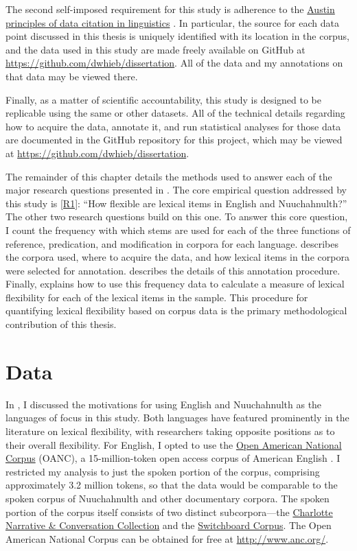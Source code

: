The second self-imposed requirement for this study is adherence to the \href{https://site.uit.no/linguisticsdatacitation/}{Austin principles of data citation in linguistics} \parencite{BerezKroekeretal2018}. In particular, the source for each data point discussed in this thesis is uniquely identified with its location in the corpus, and the data used in this study are made freely available on GitHub at \url{https://github.com/dwhieb/dissertation}. All of the data and my annotations on that data may be viewed there.

Finally, as a matter of scientific accountability, this study is designed to be replicable using the same or other datasets. All of the technical details regarding how to acquire the data, annotate it, and run statistical analyses for those data are documented in the GitHub repository for this project, which may be viewed at \url{https://github.com/dwhieb/dissertation}.

The remainder of this chapter details the methods used to answer each of the major research questions presented in . The core empirical question addressed by this study is \ref{R1}: \enquote{How flexible are lexical items in English and Nuuchahnulth?} The other two research questions build on this one. To answer this core question, I count the frequency with which stems are used for each of the three functions of reference, predication, and modification in corpora for each language.  describes the corpora used, where to acquire the data, and how lexical items in the corpora were selected for annotation.  describes the details of this annotation procedure. Finally,  explains how to use this frequency data to calculate a measure of lexical flexibility for each of the lexical items in the sample. This procedure for quantifying lexical flexibility based on corpus data is the primary methodological contribution of this thesis.

\section{Data}
\label{sec:3.2}

In , I discussed the motivations for using English and Nuuchahnulth as the languages of focus in this study. Both languages have featured prominently in the literature on lexical flexibility, with researchers taking opposite positions as to their overall flexibility. For English, I opted to use the \href{http://www.anc.org/}{Open American National Corpus} (OANC), a 15-million-token open access corpus of American English \parencite{OANC}. I restricted my analysis to just the spoken portion of the corpus, comprising approximately 3.2 million tokens, so that the data would be comparable to the spoken corpus of Nuuchahnulth and other documentary corpora. The spoken portion of the corpus itself consists of two distinct subcorpora—the \href{https://newsouthvoices.uncc.edu/}{Charlotte Narrative \& Conversation Collection}  and the \href{https://catalog.ldc.upenn.edu/LDC97S62}{Switchboard Corpus}. The Open American National Corpus can be obtained for free at \url{http://www.anc.org/}.


